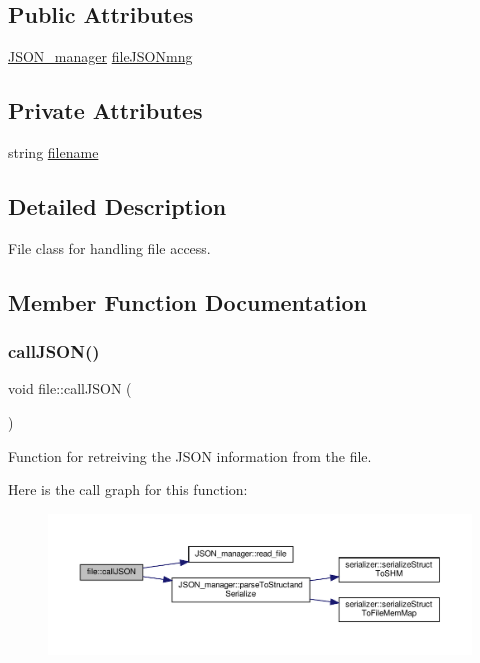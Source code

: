 \subsection*{Public Attributes}
\begin{DoxyCompactItemize}
\item 
\hyperlink{classJSON__manager}{J\+S\+O\+N\+\_\+manager} \hyperlink{classfile_aaba2c5a6566d9cbbc9fb613475eb1ce7}{file\+J\+S\+O\+Nmng}
\end{DoxyCompactItemize}
\subsection*{Private Attributes}
\begin{DoxyCompactItemize}
\item 
string \hyperlink{classfile_a9117ee5ddda3538f631fe96252de70fc}{filename}
\end{DoxyCompactItemize}


\subsection{Detailed Description}
File class for handling file access. 

\subsection{Member Function Documentation}
\mbox{\label{classfile_a6f3aeac1f4b08cd52b7879ea999fded1}} 
\subsubsection{\texorpdfstring{call\+J\+S\+O\+N()}{callJSON()}}
{\footnotesize\ttfamily void file\+::call\+J\+S\+ON (\begin{DoxyParamCaption}{ }\end{DoxyParamCaption})}



Function for retreiving the J\+S\+ON information from the file. 

Here is the call graph for this function\+:
\nopagebreak
\begin{figure}[H]
\begin{center}
\leavevmode
\includegraphics[width=350pt]{classfile_a6f3aeac1f4b08cd52b7879ea999fded1_cgraph}
\end{center}
\end{figure}
\mbox{\label{classfile_a04d228a8eabeb75ed6f6f7c87f5053db}} 
